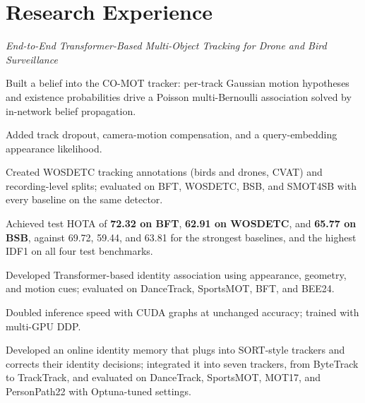 \section{Research Experience}
\textit{End-to-End Transformer-Based Multi-Object Tracking for Drone and Bird Surveillance}
\cvItemsStart
\item Built a belief into the CO-MOT tracker: per-track Gaussian motion hypotheses and existence probabilities drive a Poisson multi-Bernoulli association solved by in-network belief propagation.
\item Added track dropout, camera-motion compensation, and a query-embedding appearance likelihood.
\item Created WOSDETC tracking annotations (birds and drones, CVAT) and recording-level splits; evaluated on BFT, WOSDETC, BSB, and SMOT4SB with every baseline on the same detector.
\item Achieved test HOTA of \textbf{72.32 on BFT}, \textbf{62.91 on WOSDETC}, and \textbf{65.77 on BSB}, against 69.72, 59.44, and 63.81 for the strongest baselines, and the highest IDF1 on all four test benchmarks.
\cvItemsEnd
{}
\cvItemsStart
\item Developed Transformer-based identity association using appearance, geometry, and motion cues; evaluated on DanceTrack, SportsMOT, BFT, and BEE24.
\item Doubled inference speed with CUDA graphs at unchanged accuracy; trained with multi-GPU DDP.
\cvItemsEnd
{}
\cvItemsStart
\item Developed an online identity memory that plugs into SORT-style trackers and corrects their identity decisions; integrated it into seven trackers, from ByteTrack to TrackTrack, and evaluated on DanceTrack, SportsMOT, MOT17, and PersonPath22 with Optuna-tuned settings.
\cvItemsEnd
